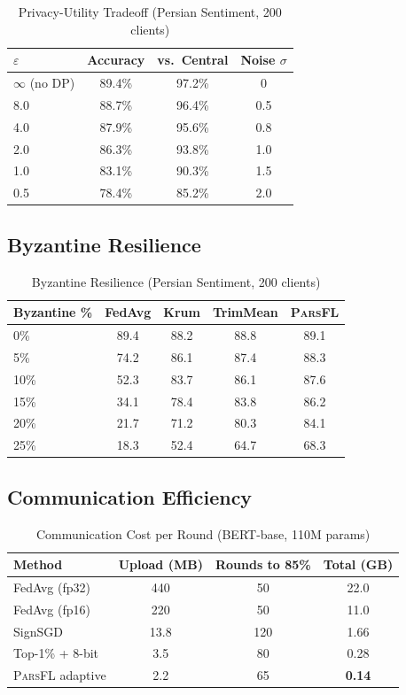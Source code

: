 \documentclass[11pt,a4paper]{article}
\newcommand{\parsfl}{\textsc{ParsFL}\xspace}
\begin{document}
\begin{table}[H]
\centering
\caption{Privacy-Utility Tradeoff (Persian Sentiment, 200 clients)}
\label{tab:privacy-utility}
\begin{tabular}{lccc}
\toprule
$\varepsilon$ & \textbf{Accuracy} & \textbf{vs.\ Central} & \textbf{Noise $\sigma$} \\
\midrule
$\infty$ (no DP) & 89.4\% & 97.2\% & 0 \\
8.0 & 88.7\% & 96.4\% & 0.5 \\
4.0 & 87.9\% & 95.6\% & 0.8 \\
2.0 & 86.3\% & 93.8\% & 1.0 \\
1.0 & 83.1\% & 90.3\% & 1.5 \\
0.5 & 78.4\% & 85.2\% & 2.0 \\
\bottomrule
\end{tabular}
\end{table}

\subsection{Byzantine Resilience}

\begin{table}[H]
\centering
\caption{Byzantine Resilience (Persian Sentiment, 200 clients)}
\label{tab:byzantine}
\begin{tabular}{lcccc}
\toprule
\textbf{Byzantine \%} & \textbf{FedAvg} & \textbf{Krum} & \textbf{TrimMean} & \textbf{\parsfl} \\
\midrule
0\% & 89.4 & 88.2 & 88.8 & 89.1 \\
5\% & 74.2 & 86.1 & 87.4 & 88.3 \\
10\% & 52.3 & 83.7 & 86.1 & 87.6 \\
15\% & 34.1 & 78.4 & 83.8 & 86.2 \\
20\% & 21.7 & 71.2 & 80.3 & 84.1 \\
25\% & 18.3 & 52.4 & 64.7 & 68.3 \\
\bottomrule
\end{tabular}
\end{table}

\subsection{Communication Efficiency}

\begin{table}[H]
\centering
\caption{Communication Cost per Round (BERT-base, 110M params)}
\label{tab:comm}
\begin{tabular}{lccc}
\toprule
\textbf{Method} & \textbf{Upload (MB)} & \textbf{Rounds to 85\%} & \textbf{Total (GB)} \\
\midrule
FedAvg (fp32) & 440 & 50 & 22.0 \\
FedAvg (fp16) & 220 & 50 & 11.0 \\
SignSGD & 13.8 & 120 & 1.66 \\
Top-1\% + 8-bit & 3.5 & 80 & 0.28 \\
\parsfl adaptive & 2.2 & 65 & \textbf{0.14} \\
\bottomrule
\end{tabular}
\end{table}
\end{document}
